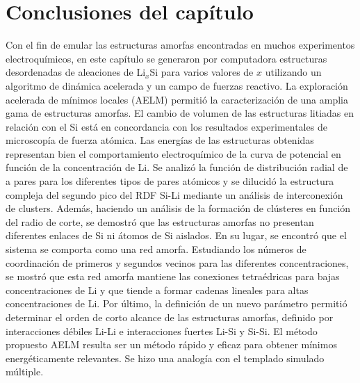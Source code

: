 \section{Conclusiones del capítulo}

Con el fin de emular las estructuras amorfas encontradas en muchos experimentos 
electroquímicos, en este capítulo se generaron por computadora estructuras desordenadas de 
aleaciones de Li$_x$Si para varios valores de $x$ utilizando un algoritmo de 
dinámica acelerada y un campo de fuerzas reactivo. La exploración acelerada de 
mínimos locales (AELM) permitió la caracterización de una amplia gama de 
estructuras amorfas. El cambio de volumen de las estructuras litiadas en relación 
con el Si está en concordancia con los resultados experimentales de microscopía de fuerza atómica. Las
energías de las estructuras obtenidas representan bien el comportamiento 
electroquímico de la curva de potencial en función de la concentración de Li. Se 
analizó la función de distribución radial de a pares para los diferentes tipos de 
pares atómicos y se dilucidó la estructura compleja del segundo pico del RDF 
Si-Li mediante un análisis de interconexión de clusters. Además, haciendo un 
análisis de la formación de clústeres en función del radio de corte, se demostró 
que las estructuras amorfas no presentan diferentes enlaces de Si ni átomos de Si 
aislados. En su lugar, se encontró que el sistema se comporta como una red amorfa.
Estudiando los números de coordinación de primeros y segundos vecinos para las 
diferentes concentraciones, se mostró que esta red amorfa mantiene las conexiones 
tetraédricas para bajas concentraciones de Li y que tiende a formar cadenas lineales para 
altas concentraciones de Li. Por último, la definición de un nuevo parámetro 
permitió determinar el orden de corto alcance de las estructuras amorfas, definido
por interacciones débiles Li-Li e interacciones fuertes Li-Si y Si-Si. El método propuesto AELM 
resulta ser un método rápido y eficaz para obtener mínimos energéticamente 
relevantes. Se hizo una analogía con el templado simulado múltiple.%
